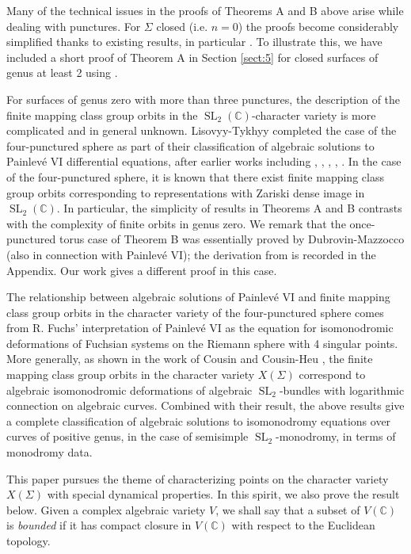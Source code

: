 \documentclass[reqno]{amsart}
\theoremstyle{plain}
\theoremstyle{definition}
\theoremstyle{remark}
\newcommand{\C}{{\mathbb{C}}}
\DeclareMathOperator{\SL}{SL}
\begin{document}
Many of the technical issues in the proofs of Theorems A and B above arise while dealing with punctures. For $\Sigma$ closed (i.e. $n=0$) the proofs become considerably simplified thanks to existing results, in particular \cite{gkm,px,coopermanning}.
To illustrate this, we have included a short proof of Theorem A 
in Section \ref{sect:5} for closed surfaces of genus at least 2 using \cite{gkm,px}.

For surfaces of genus zero with more than three punctures, the description of the finite mapping 
class group orbits in the $\SL_2(\C)$-character variety is more complicated and in general unknown. Lisovyy-Tykhyy 
\cite{lt} completed the case of the four-punctured sphere as part of their classification of 
algebraic solutions to Painlev\'e VI differential equations, after earlier works including \cite{dm}, \cite{iwasaki}, \cite{hitchin}, \cite{boalch2}, \cite{cl}. In the case of the four-punctured sphere, it is known that there exist 
finite mapping class group orbits corresponding to representations with Zariski dense image in
$\SL_2(\C)$. In particular, the simplicity of results in Theorems A and B contrasts with the complexity of finite orbits in genus zero. We remark that the once-punctured torus case of Theorem B was essentially proved 
by Dubrovin-Mazzocco \cite{dm} (also in connection with Painlev\'e VI); the derivation from \cite{dm} is recorded in the Appendix. Our work gives a different proof in this case.

The relationship between algebraic solutions of Painlev\'e VI and finite mapping class group orbits in the character variety of the four-punctured sphere comes from R. Fuchs' interpretation of Painlev\'e VI \cite{fuchs} as the equation for isomonodromic deformations of Fuchsian systems on the Riemann sphere with 4 singular points. More generally, as shown in the work of Cousin \cite{cousin} and Cousin-Heu \cite{ch}, the finite mapping class group orbits in the character variety $X(\Sigma)$ correspond to algebraic isomonodromic deformations of algebraic $\SL_2$-bundles with logarithmic connection on algebraic curves. Combined with their result, the above results give a complete classification of algebraic solutions to isomonodromy equations over curves of positive genus, in the case of semisimple $\SL_2$-monodromy, in terms of monodromy data.

This paper pursues the theme of characterizing points on the character variety $X(\Sigma)$ 
with special dynamical properties. In this spirit, we also prove the result below. Given a 
complex algebraic variety $V$, we shall say that a subset of $V(\C)$ is \emph{bounded} if it 
has compact closure in $V(\C)$ with respect to the Euclidean topology.
\end{document}
